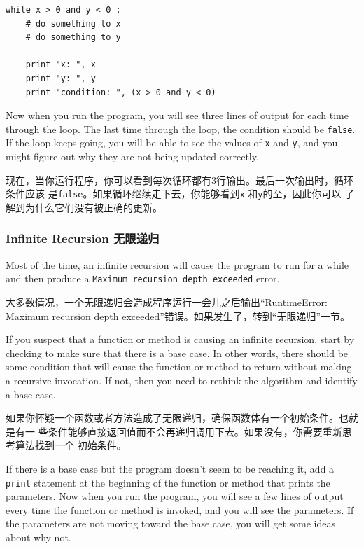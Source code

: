 \documentclass[10pt]{book}
\begin{document}
\begin{CJK}{UTF8}{gbsn}
\begin{verbatim}
while x > 0 and y < 0 :
    # do something to x
    # do something to y

    print "x: ", x
    print "y: ", y
    print "condition: ", (x > 0 and y < 0)
\end{verbatim}
%
Now when you run the program, you will see three lines of output
for each time through the loop.  The last time through the
loop, the condition should be {\tt false}.  If the loop keeps
going, you will be able to see the values of {\tt x} and {\tt y},
and you might figure out why they are not being updated correctly.

现在，当你运行程序，你可以看到每次循环都有3行输出。最后一次输出时，循环条件应该
是{\tt false}。如果循环继续走下去，你能够看到{\tt x} 和{\tt y}的至，因此你可以
了解到为什么它们没有被正确的更新。

\subsubsection{Infinite Recursion 无限递归}

Most of the time, an infinite recursion will cause the program to run
for a while and then produce a {\tt Maximum recursion depth exceeded}
error.

大多数情况，一个无限递归会造成程序运行一会儿之后输出``RuntimeError: Maximum
recursion depth exceeded''错误。如果发生了，转到``无限递归''一节。

If you suspect that a function or method is causing an infinite
recursion, start by checking to make sure that there is a base case.
In other words, there should be some condition that will cause the
function or method to return without making a recursive invocation.
If not, then you need to rethink the algorithm and identify a base
case.

如果你怀疑一个函数或者方法造成了无限递归，确保函数体有一个初始条件。也就是有一
些条件能够直接返回值而不会再递归调用下去。如果没有，你需要重新思考算法找到一个
初始条件。

If there is a base case but the program doesn't seem to be reaching
it, add a {\tt print} statement at the beginning of the function or method
that prints the parameters.  Now when you run the program, you will see
a few lines of output every time the function or method is invoked,
and you will see the parameters.  If the parameters are not moving
toward the base case, you will get some ideas about why not.


\end{CJK}
\end{document}
